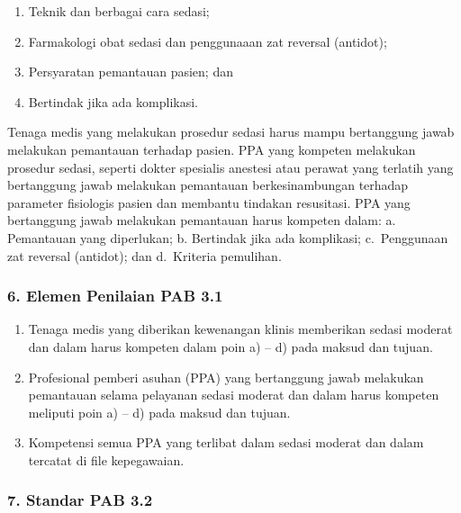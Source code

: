 \documentclass[
]{book}
\providecommand{\tightlist}{%
  \setlength{\itemsep}{0pt}\setlength{\parskip}{0pt}}
\begin{document}
\begin{enumerate}
\def\labelenumi{\alph{enumi}.}
\tightlist
\item
  Teknik dan berbagai cara sedasi;
\item
  Farmakologi obat sedasi dan penggunaaan zat reversal (antidot);
\item
  Persyaratan pemantauan pasien; dan
\item
  Bertindak jika ada komplikasi.
\end{enumerate}

Tenaga medis yang melakukan prosedur sedasi harus mampu bertanggung jawab melakukan pemantauan terhadap pasien. PPA yang kompeten melakukan prosedur sedasi, seperti dokter spesialis anestesi atau perawat yang terlatih yang bertanggung jawab melakukan pemantauan berkesinambungan terhadap parameter fisiologis pasien dan membantu tindakan resusitasi. PPA yang bertanggung jawab melakukan pemantauan harus kompeten dalam:
a. Pemantauan yang diperlukan;
b. Bertindak jika ada komplikasi;
c.~Penggunaan zat reversal (antidot); dan
d.~Kriteria pemulihan.

\hypertarget{elemen-penilaian-pab-3.1}{%
\subsubsection*{6. Elemen Penilaian PAB 3.1}\label{elemen-penilaian-pab-3.1}}

\begin{enumerate}
\def\labelenumi{\alph{enumi}.}
\tightlist
\item
  Tenaga medis yang diberikan kewenangan klinis memberikan sedasi moderat dan dalam harus kompeten dalam poin a) -- d) pada maksud dan tujuan.
\item
  Profesional pemberi asuhan (PPA) yang bertanggung jawab melakukan pemantauan selama pelayanan sedasi moderat dan dalam harus kompeten meliputi poin a) -- d) pada maksud dan tujuan.
\item
  Kompetensi semua PPA yang terlibat dalam sedasi moderat dan dalam tercatat di file kepegawaian.
\end{enumerate}

\hypertarget{standar-pab-3.2}{%
\subsubsection*{7. Standar PAB 3.2}\label{standar-pab-3.2}}
\end{document}
